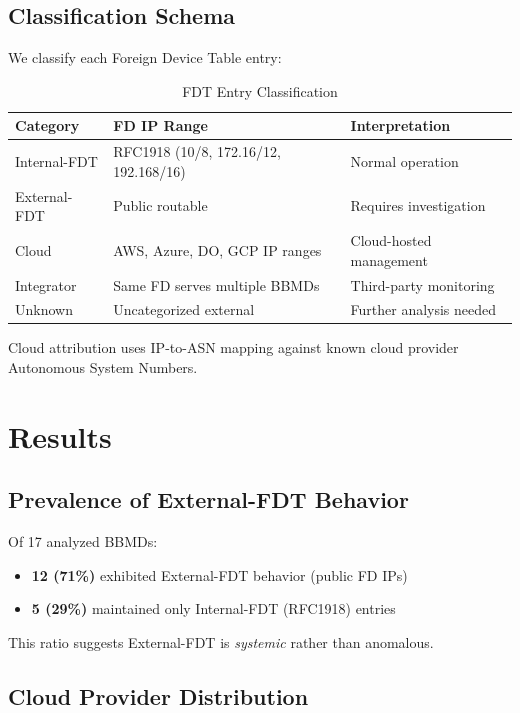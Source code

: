 \documentclass[11pt,a4paper]{article}
\begin{document}
\subsection{Classification Schema}

We classify each Foreign Device Table entry:

\begin{table}[h]
\centering
\begin{tabular}{lll}
\toprule
\textbf{Category} & \textbf{FD IP Range} & \textbf{Interpretation} \\
\midrule
Internal-FDT & RFC1918 (10/8, 172.16/12, 192.168/16) & Normal operation \\
External-FDT & Public routable & Requires investigation \\
\quad Cloud & AWS, Azure, DO, GCP IP ranges & Cloud-hosted management \\
\quad Integrator & Same FD serves multiple BBMDs & Third-party monitoring \\
\quad Unknown & Uncategorized external & Further analysis needed \\
\bottomrule
\end{tabular}
\caption{FDT Entry Classification}
\label{tab:classification}
\end{table}

Cloud attribution uses IP-to-ASN mapping against known cloud provider 
Autonomous System Numbers.

\section{Results}
\label{sec:results}

\subsection{Prevalence of External-FDT Behavior}

Of 17 analyzed BBMDs:
\begin{itemize}
  \item \textbf{12 (71\%)} exhibited External-FDT behavior (public FD IPs)
  \item \textbf{5 (29\%)} maintained only Internal-FDT (RFC1918) entries
\end{itemize}

This ratio suggests External-FDT is \emph{systemic} rather than anomalous.

\subsection{Cloud Provider Distribution}
\end{document}
